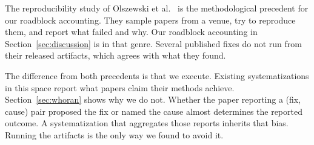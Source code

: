 The reproducibility study of Olszewski et
al.~\cite{olszewski-2023-reproducibility} is the methodological precedent for our roadblock accounting. They sample papers from a venue, try to reproduce them, and
report what failed and why. Our roadblock accounting in
Section~\ref{sec:discussion} is in that genre. Several published fixes do
not run from their released artifacts, which agrees with what they found.

The difference from both precedents is that we execute. Existing
systematizations in this space report what papers claim their methods
achieve. Section~\ref{sec:whoran} shows why we do not. Whether the paper
reporting a (fix, cause) pair proposed the fix or named the cause almost
determines the reported outcome. A systematization that aggregates those reports inherits that
bias. Running the artifacts is the only way we found to avoid it.
